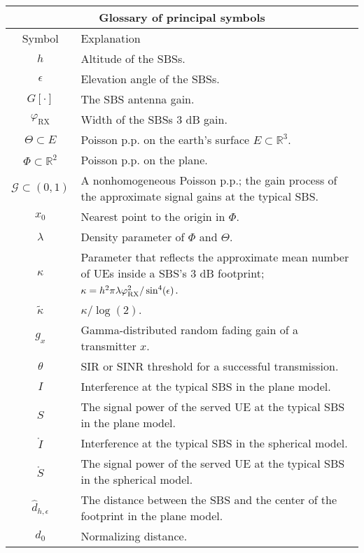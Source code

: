 \documentclass[conference]{IEEEtran}
\newcommand{\R}{\mathbb{R}}
\theoremstyle{definition}
\theoremstyle{plain}
\begin{document}
          \begin{table}
           \begin{center}
             \begin{tabular}{| c | p{7cm}  |}
               \hline
               \multicolumn{2}{|c|}{Glossary of principal symbols} \\
               \hline
               Symbol& Explanation 
               \\ 
               \hline
               $h$ & Altitude of the SBSs. \\
               $\epsilon$ & Elevation angle of the SBSs. \\
               $G[\cdot]$ & The SBS antenna gain.\\
               $\varphi_{\text{RX}}$ & Width of the SBSs $3$ dB gain. \\
               $\Theta \subset E $ & Poisson p.p. on the earth's surface $E \subset \R^3$. \\
               $\Phi \subset \R^2$ & Poisson p.p. on the plane. \\
                $\mathcal{G} \subset (0,1)$ & A nonhomogeneous Poisson p.p.; the gain process of the approximate signal gains at the typical SBS.  \\
               $x_0$ & Nearest point to the origin in $\Phi$.  \\
               $\lambda$ & Density parameter of $\Phi$ and $\Theta$. \\
               $\kappa$ & Parameter that reflects the approximate mean number of UEs inside a SBS's $3$ dB footprint;  $\kappa = h^2\pi \lambda \varphi_{\textup{RX}}^2/\sin^4(\epsilon)$. \\
               ${\tilde{\kappa}}$ &  $\kappa/\log(2)$.\\
               $g_x$ &   Gamma-distributed random fading gain of a transmitter $x$.     \\
               $\theta$ & SIR or SINR threshold for a successful transmission.\\
               $I$ & Interference at the typical SBS in the plane model.\\
               $S$ & The signal power of the served UE at the typical SBS in the plane model.\\
               $\mathring{I}$ & Interference at the typical SBS in the spherical model.\\
               $\mathring{S}$ & The signal power of the served UE at the typical SBS in the spherical model.\\ 
               $\hat{d}_{h,\epsilon}$ & The distance between the SBS and the center of the footprint in the plane model.\\
               $d_{0}$ & Normalizing distance.  \\           
             
               \hline
             \end{tabular}
           \end{center}
         \end{table}   
\end{document}
